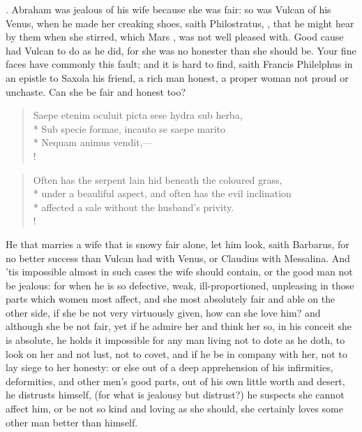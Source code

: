 . Abraham was jealous of his wife because she
was fair: so was Vulcan of his Venus, when he made her creaking shoes, saith
Philostratus, , that he might hear by them when she stirred, which Mars ,
was not well pleased with. Good cause had Vulcan to do as he did,
for she was no honester than she should be. Your fine faces have
commonly this fault; and it is hard to find, saith Francis Philelphus
in an epistle to Saxola his friend, a rich man honest, a proper woman
not proud or unchaste. Can she be fair and honest too?
%
\begin{latin}%
\begin{verse}%
Saepe etenim oculuit picta sese hydra sub herba,\\*
Sub specie formae, incauto se saepe marito\\*
Nequam animus vendit,---\\!
\end{verse}%
\end{latin}%
\translationrule%
\begin{verse}%
Often has the serpent lain hid beneath the coloured grass,\\*
under a beauliful aspect, and often has the evil inclination\\*
affected a sale without the husband's privity.\\!
\end{verse}%
%

He that marries a wife that is snowy fair alone, let him look, saith
 Barbarus, for no better success than Vulcan had with Venus, or
Claudius with Messalina. And 'tis impossible almost in such cases the
wife should contain, or the good man not be jealous: for when he is so
defective, weak, ill-proportioned, unpleasing in those parts which
women most affect, and she most absolutely fair and able on the other
side, if she be not very virtuously given, how can she love him? and
although she be not fair, yet if he admire her and think her so, in his
conceit she is absolute, he holds it impossible for any man living not
to dote as he doth, to look on her and not lust, not to covet, and if
he be in company with her, not to lay siege to her honesty: or else out
of a deep apprehension of his infirmities, deformities, and other men's
good parts, out of his own little worth and desert, he distrusts
himself, (for what is jealousy but distrust?) he suspects she cannot
affect him, or be not so kind and loving as she should, she certainly
loves some other man better than himself.

